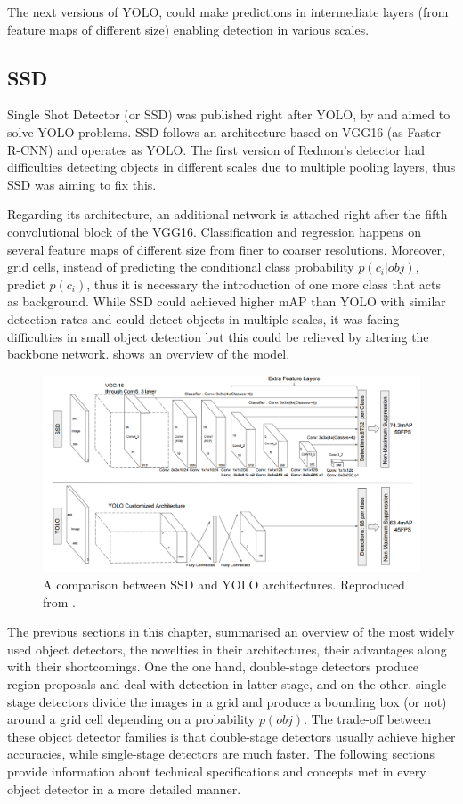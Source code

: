 The next versions of YOLO, could make predictions in intermediate layers (from feature maps of different size) enabling detection in various scales. 
 
\subsection{SSD}
Single Shot Detector (or SSD) was published right after YOLO, by \cite{liu2016ssd} and aimed to solve YOLO problems. SSD follows an architecture based on VGG16 (as Faster R-CNN) and operates as YOLO. The first version of Redmon's detector had difficulties detecting objects in different scales due to multiple pooling layers, thus SSD was aiming to fix this. 

Regarding its architecture, an additional network is attached right after the fifth convolutional block of the VGG16. Classification and regression happens on several feature maps of different size from finer to coarser resolutions. Moreover, grid cells, instead of predicting the conditional class probability $p(c_i|obj)$, predict $p(c_i)$, thus it is necessary the introduction of one more class that acts as background. While SSD could achieved higher mAP than YOLO with similar detection rates and could detect objects in multiple scales, it was facing difficulties in small object detection but this could be relieved by altering the backbone network.   shows an overview of the model.
 
\begin{figure}[!htb]
  \centering
  \includegraphics[width=12cm]{images/ch2/fig6.png}
  \caption{A comparison between SSD and YOLO architectures. Reproduced from \cite{liu2016ssd}.}
  \label{fig6}
\end{figure} 
 
The previous sections in this chapter, summarised an overview of the most widely used object detectors, the novelties in their architectures, their advantages along with their shortcomings. One the one hand, double-stage detectors produce region proposals and deal with detection in latter stage, and on the other, single-stage detectors divide the images in a grid and produce a bounding box (or not) around a grid cell depending on a probability $p(obj)$. The trade-off between these object detector families is that double-stage detectors usually achieve higher accuracies, while single-stage detectors are much faster. The following sections provide information about technical specifications and concepts met in every object detector in a more detailed manner.

